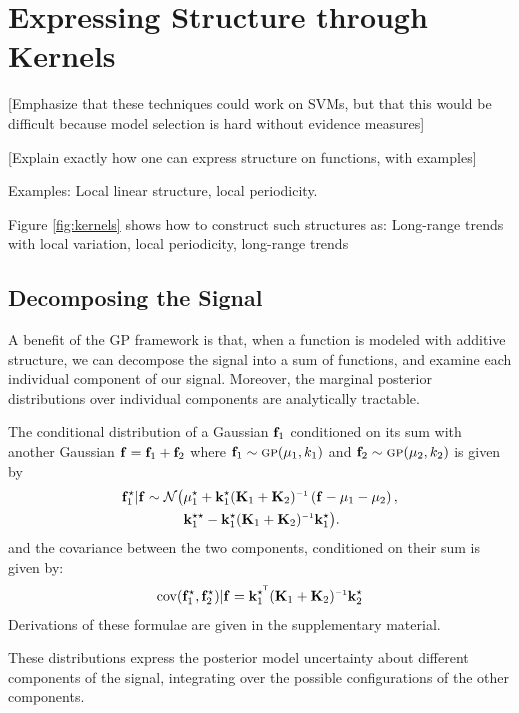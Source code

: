 \documentclass[twoside]{article}
\begin{document}
\section{Expressing Structure through Kernels}

[Emphasize that these techniques could work on SVMs, but that this would be difficult because model selection is hard without evidence measures]

[Explain exactly how one can express structure on functions, with examples]

Examples: Local linear structure, local periodicity.

Figure \ref{fig:kernels} shows how to construct such structures as:  Long-range trends with local variation, local periodicity, long-range trends 





\subsection{Decomposing the Signal}

A benefit of the GP framework is that, when a function is modeled with additive structure, we can decompose the signal into a sum of functions, and examine each individual component of our signal.
Moreover, the marginal posterior distributions over individual components are analytically tractable.

The conditional distribution of a Gaussian ${\bf{f}}_1$ conditioned on its sum with another Gaussian ${\bf{f}} = {\bf{f}}_1 + {\bf{f}}_2$ where ${\bf{f}}_1 \sim {\textsc{gp}}( {\bf{\mu}}_1, k_1)$ and ${\bf{f}}_2 \sim {\textsc{gp}}( {\bf{\mu}}_2, k_2)$ is given by
\begin{align}
\vf_1^\star | \vf \sim \mathcal{N} \big( & \vmu_1^\star + \vk_1^\star (\vK_1 + \vK_2)\inv \left( \vf - \vmu_1 - \vmu_2 \right), \nonumber \\
& \vk_1^{\star\star} - \vk_1^\star (\vK_1 + \vK_2)\inv \vk_1^\star \big).
\end{align}
and the covariance between the two components, conditioned on their sum is given by:
\begin{align}
\cov(\vf_1^\star, \vf_2^\star) | \vf = \vk_1^{\star\tra} (\vK_1 + \vK_2)\inv \vk_2^\star
\end{align}
Derivations of these formulae are given in the supplementary material.

These distributions express the posterior model uncertainty about different components of the signal, integrating over the possible configurations of the other components.
\end{document}

